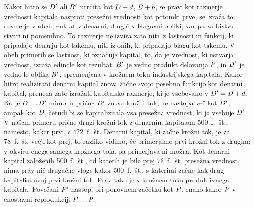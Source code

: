 \documentclass[kapital_02.tex]{subfiles}
\begin{document}
Kakor hitro se \( D' \) ali \( B' \) utrdita kot \( D + d \), \( B + b \), se pravi kot razmerje vrednosti kapitala nasproti presežni vrednosti kot potomki prve, se izraža to razmerje v obeh, enkrat \KPEstran v denarni, drugič v blagovni obliki, kar pa za bistvo stvari ni pomembno. To razmerje ne izvira zato niti iz lastnosti in funkcij, ki pripadajo denarju kot takemu, niti iz onih, ki pripadajo blagu kot takemu. V obeh primerih se lastnost, ki označuje kapital, to, da je vrednost, ki ustvarja vrednost, izraža edinole kot rezultat. \( B' \) je vedno produkt delovanja \( P \), in \( D' \) je vedno le oblika \( B' \), spremenjena v krožnem toku industrijskega kapitala. Kakor hitro realizirani denarni kapital znova začne svojo posebno funkcijo kot denarni kapital, preneha zato izražati kapitalsko razmerje, ki je vsebovano v \( D' = D + d \). Ko je \( D \dots D' \) mimo in prične \( D' \) znova krožni tok, ne nastopa več kot \( D' \), ampak kot \( D \), četudi bi se kapitalizirala vsa presežna vrednost, ki jo vsebuje \( D' \). V našem primeru prične drugi krožni tok z denarnim kapitalom 500~f.~št., namesto, kakor prvi, s 422~f.~št. Denarni kapital, ki začne krožni tok, je za 78~f.~št. večji kot prej; to razliko vidimo, če primerjamo prvi krožni tok z drugim; v okviru enega samega krožnega toka pa primerjava ni možna. Kot denarni kapital založenih 500~f.~št., od katerih je bilo prej 78~f.~št. presežna vrednost, nima prav nič drugačne vloge kakor 500~f.~št., s katerimi začne kak drug kapitalist svoj prvi krožni tok. Prav tako je v krožnem toku produktivnega kapitala. Povečani \( P' \) nastopi pri ponovnem začetku kot \( P \), enako kakor \( P \) v enostavni reprodukciji \( P \dots P \).
\end{document}

